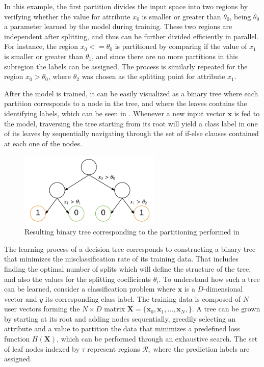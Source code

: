 \documentclass{kththesis}
\begin{document}
In this example, the first partition divides the input space into two regions by verifying whether the value for attribute $x_0$ is smaller or greater than $\theta_0$, being $\theta_0$ a parameter learned by the model during training. These two regions are independent after splitting, and thus can be further divided efficiently in parallel. For instance, the region $x_0 <= \theta_0$ is partitioned by comparing if the value of $x_1$ is smaller or greater than $\theta_1$, and since there are no more partitions in this subregion the labels can be assigned. The process is similarly repeated for the region  $x_0 > \theta_0$, where $\theta_2$ was chosen as the splitting point for attribute $x_1$.
 
After the model is trained, it can be easily visualized as a binary tree where each partition corresponds to a node in the tree, and where the leaves contains the identifying labels, which can be seen in . Whenever a new input vector $\mathbf{x}$ is fed to the model, traversing the tree starting from its root will yield a class label in one of its leaves by sequentially navigating through the set of if-else clauses contained at each one of the nodes.  
 
\begin{figure}[h]
    \centering
    \includegraphics[width=0.6\textwidth,keepaspectratio]{figures/dectree_bin.pdf}
    \caption{Resulting binary tree corresponding to the partitioning performed in }
    \label{fig:dectree_bin}
\end{figure}
 
The learning process of a decision tree corresponds to constructing a binary tree that minimizes the misclassification rate of its training data. That includes finding the optimal number of splits which will define the structure of the tree, and also the values for the splitting coefficients $\theta_i$. To understand how such a tree can be learned, consider a classification problem where $\mathbf{x}$ is a $D$-dimensional vector and $y$ its corresponding class label. The training data is composed of $N$ user vectors forming the $N \times D$ matrix $\mathbf{X} = \{\mathbf{x}_0, \mathbf{x}_1, ..., \mathbf{x}_N,\}$. A tree can be grown by starting at its root and adding nodes sequentially, greedily selecting an attribute and a value to partition the data that minimizes a predefined loss function $H(\mathbf{X})$, which can be performed through an exhaustive search. The set of leaf nodes indexed by $\tau$ represent regions $\mathcal{R}_\tau$ where the prediction labels are assigned.
\end{document}
